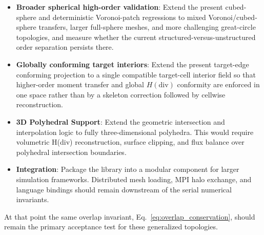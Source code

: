 \documentclass[11pt]{article}
\begin{document}
\begin{itemize}
\begin{enumerate}
      This approach eliminates the geometric error entirely for
      great-circle / small-circle boundaries, achieving
      \(O(h^{p+1})\) cell-divergence rates without mesh refinement.  It
      generalizes naturally to any pair of circle types (great/great,
      great/small, small/small) that arise in mixed-mesh transfers.  The main
      implementation cost is a specialized quadrature rule for conic-arc
      segments in the chart and careful handling of tangent/degenerate
      intersection configurations.
    \end{enumerate}
    Of these, adaptive chord subdivision is the simpler near-term path and
    would directly validate the error-budget analysis.  Exact conic-arc
    clipping is the long-term target for production implementations where
    geometric error must be controlled independently of mesh resolution.
    \item \textbf{Broader spherical high-order validation}: Extend the present
    cubed-sphere and deterministic Voronoi-patch regressions to mixed
    Voronoi/cubed-sphere transfers, larger full-sphere meshes, and more
    challenging great-circle topologies, and measure whether the current
    structured-versus-unstructured order separation persists there.
    \item \textbf{Globally conforming target interiors}: Extend the present
    target-edge conforming projection to a single compatible target-cell
    interior field so that higher-order moment transfer and global
    \(H(\mathrm{div})\) conformity are enforced in one space rather than by a
    skeleton correction followed by cellwise reconstruction.
    \item \textbf{3D Polyhedral Support}: Extend the geometric intersection and
    interpolation logic to fully three-dimensional polyhedra.  This would
    require volumetric H(div) reconstruction, surface clipping, and flux
    balance over polyhedral intersection boundaries.
    \item \textbf{Integration}: Package the library into a modular component
    for larger simulation frameworks.  Distributed mesh loading, MPI halo
    exchange, and language bindings should remain downstream of the serial
    numerical invariants.
\end{itemize}

At that point the same overlap invariant, Eq.~\eqref{eq:overlap_conservation},
should remain the primary acceptance test for these generalized topologies.
\end{document}
